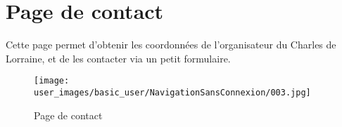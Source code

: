 \section{Page de contact}

Cette page permet d'obtenir les coordonnées de l'organisateur du Charles de Lorraine, et de les contacter via un petit formulaire.

\begin{figure}[H]
\centering
\texttt{[image: user\_images/basic\_user/NavigationSansConnexion/003.jpg]}
\caption{Page de contact}
\end{figure}
